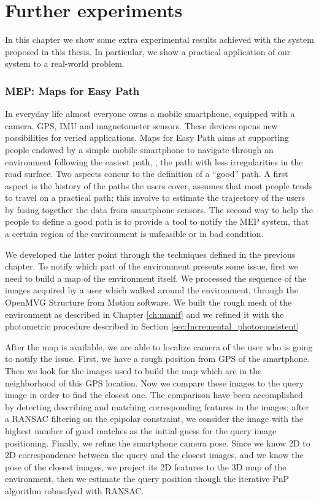 \chapter{Further experiments}
In this chapter we show some extra experimental results achieved with the system proposed in this thesis.
In particular, we show a practical application of our system to a real-world problem. 
\subsection{MEP: Maps for Easy Path}
In everyday life almost everyone owns a mobile smartphone, equipped with a camera, GPS, IMU and magnetometer sensors. 
These devices opens new possibilities for veried applications.
Maps for Easy Path aims at supporting people endowed by a simple mobile smartphone to navigate through an environment following the easiest path, \ie, the path with less irregularities in the road surface. 
Two aspects concur to the definition of a ``good'' path.
A first aspect is the history of the paths the users cover, assumes that most people tends to travel on a practical path; this involve to estimate the trajectory of the users by fusing together the data from smartphone sensors. 
The second way to help the people to define a good path is to provide a tool to notify the MEP system, that a certain  region of the environment is unfeasible or in bad condition.

We developed the latter point through the techniques defined in the previous chapter.
To notify which part of the environment presents some issue, first we need to build a map of the environment itself. 
We processed the sequence of the images acquired by a user which walked around the environment, through the OpenMVG Structure from Motion software. 
We built the rough mesh of the environment as described in Chapter \ref{ch:manif} and we refined it with the photometric procedure described in Section \ref{sec:Incremental_photoconsistent}

After the map is available, we are able to localize  camera  of the user who is going to notify the issue.
First, we have a rough position from GPS of the smartphone. 
Then we look for the images used to build the map which are in the neighborhood of this GPS location.
Now we compare these images to the query image in order to find the closest one. 
The comparison have been accomplished by detecting describing  and matching corresponding features in the images; after a RANSAC filtering on the epipolar constraint, we consider the image with the highest number of good matches as the initial guess for the query image positioning.
Finally, we refine the smartphone camera pose. 
Since we know 2D to 2D correspondence between the query and the closest images, and we know the pose of the closest images, we project its 2D features to the 3D map of the environment, then we estimate the query position though the iterative PnP algorithm \cite{hartley2003multiple} robusifyed with RANSAC.




